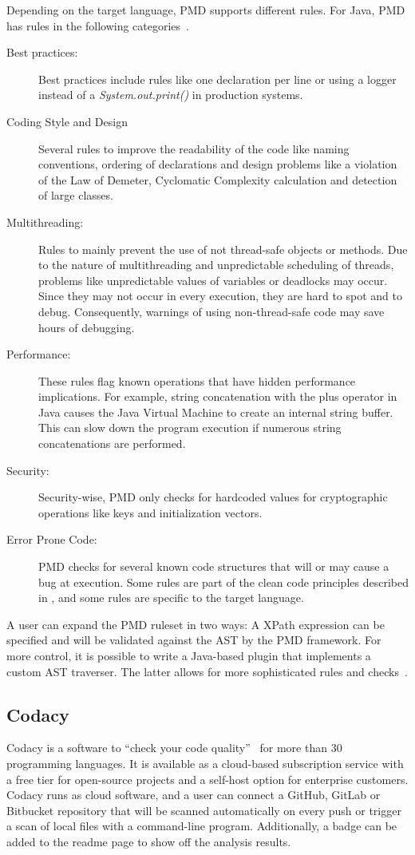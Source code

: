 Depending on the target language, PMD supports different rules. For Java, PMD has rules in the following categories~\cite{noauthor_documentation_nodate}.
\begin{description}
    \item[Best practices:] Best practices include rules like one declaration per line or using a logger instead of a \textit{System.out.print()} in production systems.  
    \item[Coding Style and Design] Several rules to improve the readability of the code like naming conventions, ordering of declarations and design problems like a violation of the Law of Demeter, Cyclomatic Complexity calculation and detection of large classes.
    \item[Multithreading:]  Rules to mainly prevent the use of not thread-safe objects or methods. Due to the nature of multithreading and unpredictable scheduling of threads, problems like unpredictable values of variables or deadlocks may occur. Since they may not occur in every execution, they are hard to spot and to debug. Consequently, warnings of using non-thread-safe code may save hours of debugging.
    \item[Performance:] These rules flag known operations that have hidden performance implications. For example, string concatenation with the plus operator in Java causes the Java Virtual Machine to create an internal string buffer. This can slow down the program execution if numerous string concatenations are performed.
    \item[Security:] Security-wise, PMD only checks for hardcoded values for cryptographic operations like keys and initialization vectors.
    \item[Error Prone Code:] PMD checks for several known code structures that will or may cause a bug at execution. Some rules are part of the clean code principles described in , and some rules are specific to the target language.
\end{description}

A user can expand the PMD ruleset in two ways: A XPath expression can be specified and will be validated against the AST by the PMD framework. For more control, it is possible to write a Java-based plugin that implements a custom AST traverser. The latter allows for more sophisticated rules and checks~\cite{noauthor_documentation_nodate}.

\subsection{Codacy}
Codacy is a software to \enquote{check your code quality}~\cite{noauthor_codacy_nodate} for more than 30 programming languages. It is available as a cloud-based subscription service with a free tier for open-source projects and a self-host option for enterprise customers.  Codacy runs as cloud software, and a user can connect a GitHub, GitLab or Bitbucket repository that will be scanned automatically on every push or trigger a scan of local files with a command-line program. Additionally, a badge can be added to the readme page to show off the analysis results.


